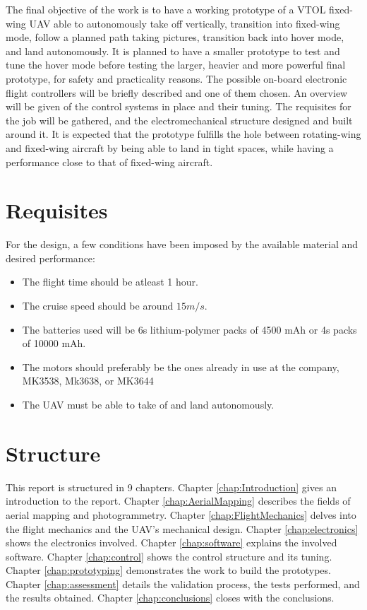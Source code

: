 %
The final objective of the work is to have a working prototype of a VTOL fixed-wing UAV able to autonomously take off vertically, transition into fixed-wing mode, follow a planned path taking pictures, transition back into hover mode, and land autonomously.
%
It is planned to have a smaller prototype to test and tune the hover mode before testing the larger, heavier and more powerful final prototype, for safety and practicality reasons.
%
The possible on-board electronic flight controllers will be briefly described and one of them chosen.
%
An overview will be given of the control systems in place and their tuning.
%
The requisites for the job will be gathered, and the electromechanical structure designed and built around it.
%
It is expected that the prototype fulfills the hole between rotating-wing and fixed-wing aircraft by being able to land in tight spaces, while having a performance close to that of fixed-wing aircraft.

\section{Requisites}

For the design, a few conditions have been imposed by the available material and desired performance:

\begin{itemize}

\item The flight time should be atleast 1 hour.
\item The cruise speed should be around $15 m/s$.
\item The batteries used will be 6s lithium-polymer packs of 4500 mAh or 4s packs of 10000 mAh.
\item The motors should preferably be the ones already in use at the company, MK3538, Mk3638, or MK3644
\item The UAV must be able to take of and land autonomously.

\end{itemize}


\section{Structure}
	
%
This report is structured in 9 chapters.
%
Chapter \ref{chap:Introduction} gives an introduction to the report.
%
Chapter \ref{chap:AerialMapping} describes the fields of aerial mapping and photogrammetry.
%
Chapter \ref{chap:FlightMechanics} delves into the flight mechanics and the UAV's mechanical design.
%
Chapter \ref{chap:electronics} shows the electronics involved.
%
Chapter \ref{chap:software} explains the involved software.
%
Chapter \ref{chap:control} shows the control structure and its tuning.
%
Chapter \ref{chap:prototyping} demonstrates the work to build the prototypes.
%
Chapter \ref{chap:assessment} details the validation process, the tests performed, and the results obtained.
%
Chapter \ref{chap:conclusions} closes with the conclusions.

